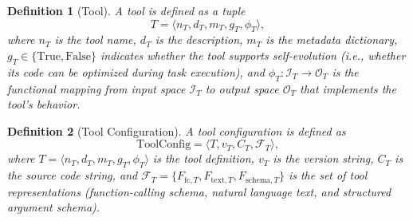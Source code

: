 \documentclass[11pt]{article}
\newtheorem{definition}{Definition}
\begin{document}
\begin{definition}[Tool]
  A tool is defined as a tuple
  \[ T = \langle n_T, d_T, m_T, g_T, \phi_T \rangle, \]
  where $n_T$ is the tool name, $d_T$ is the description, $m_T$ is the metadata dictionary, $g_T \in \{\mathrm{True}, \mathrm{False}\}$ indicates whether the tool supports self-evolution (i.e., whether its code can be optimized during task execution), and $\phi_T: \mathcal{I}_T \to \mathcal{O}_T$ is the functional mapping from input space $\mathcal{I}_T$ to output space $\mathcal{O}_T$ that implements the tool's behavior.
  \end{definition}
  
  \begin{definition}[Tool Configuration]
  A tool configuration is defined as
  \[ \mathrm{ToolConfig} = \langle T, v_T, C_T, \mathcal{F}_T \rangle, \]
  where $T = \langle n_T, d_T, m_T, g_T, \phi_T \rangle$ is the tool definition, $v_T$ is the version string, $C_T$ is the source code string, and $\mathcal{F}_T = \{F_{\mathrm{fc},T}, F_{\mathrm{text},T}, F_{\mathrm{schema},T}\}$ is the set of tool representations (function-calling schema, natural language text, and structured argument schema).
  \end{definition}
  
\end{document}
